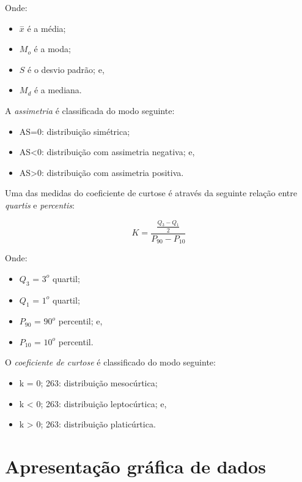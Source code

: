 \documentclass[
]{book}
\providecommand{\tightlist}{%
  \setlength{\itemsep}{0pt}\setlength{\parskip}{0pt}}
\begin{document}
Onde:

\begin{itemize}
\tightlist
\item
  \(\stackrel{-}{x}\) é a média;
\item
  \(M_{o}\) é a moda;
\item
  \(S\) é o desvio padrão; e,
\item
  \(M_{d}\) é a mediana.
\end{itemize}

A \emph{assimetria} é classificada do modo seguinte:

\begin{itemize}
\tightlist
\item
  AS=0: distribuição simétrica;
\item
  AS\textless0: distribuição com assimetria negativa; e,
\item
  AS\textgreater0: distribuição com assimetria positiva.
\end{itemize}

Uma das medidas do coeficiente de curtose é através da seguinte relação entre \emph{quartis} e \emph{percentis}:

\[
K = \frac{\frac{Q_{3} - Q_{1}}{2}   }   {P_{90} - P_{10}} 
\]

Onde:

\begin{itemize}
\tightlist
\item
  \(Q_{3}\) = \(3^{o}\) quartil;
\item
  \(Q_{1}\) = \(1^{o}\) quartil;
\item
  \(P_{90}\) = \(90^{o}\) percentil; e,
\item
  \(P_{10}\) = \(10^{o}\) percentil.
\end{itemize}

O \emph{coeficiente de curtose} é classificado do modo seguinte:

\begin{itemize}
\tightlist
\item
  k = 0; 263: distribuição mesocúrtica;
\item
  k \textless{} 0; 263: distribuição leptocúrtica; e,
\item
  k \textgreater{} 0; 263: distribuição platicúrtica.
\end{itemize}

\hypertarget{apresentauxe7uxe3o-gruxe1fica-de-dados}{%
\section{Apresentação gráfica de dados}\label{apresentauxe7uxe3o-gruxe1fica-de-dados}}
\end{document}

